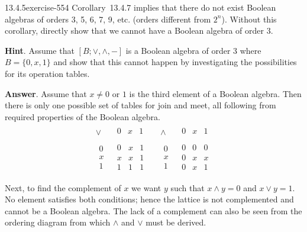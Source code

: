 \documentclass[twoside,10pt,]{book}
\numberwithin{equation}{section}
\begin{document}
\begin{divisionsolution}{13.4.5}{}{exercise-554}%
\hypertarget{p-4946}{}%
Corollary~13.4.7 implies that there do not exist Boolean algebras of orders 3, 5, 6, 7, 9, etc. (orders different from \(2^n\)). Without this corollary, directly show that we cannot have a Boolean algebra of order 3.%
\par\smallskip%
\noindent\textbf{Hint}.\quad%
\hypertarget{p-4947}{}%
Assume that \([B; \lor , \land, - ]\) is a Boolean algebra of order 3 where \(B = \{0,
x, 1\}\) and show that this cannot happen by investigating the possibilities for its operation tables.%
\par\smallskip%
\noindent\textbf{Answer}.\quad%
\hypertarget{p-4948}{}%
Assume that \(x \neq  0 \textrm{ or } 1\) is the third element of a Boolean algebra. Then there is only one possible set of tables for join and meet, all following from required properties of the Boolean algebra.%
\begin{equation*}
\begin{array}{lr}
\begin{array}{c|c}
\lor  & 
\begin{array}{ccc}
0 & x & 1 \\
\end{array}
\\
\hline
\begin{array}{c}
0 \\
x \\
1 \\
\end{array}
& 
\begin{array}{ccc}
0 & x & 1 \\
x & x & 1 \\
1 & 1 & 1 \\
\end{array}
\\
\end{array}       
& 
\begin{array}{c|c}
\land  & 
\begin{array}{ccc}
0 & x & 1 \\
\end{array}
\\
\hline
\begin{array}{c}
0 \\
x \\
1 \\
\end{array}
& 
\begin{array}{ccc}
0 & 0 & 0 \\
0 & x & x \\
0 & x & 1 \\
\end{array}
\\
\end{array}
\end{array}
\end{equation*}
Next, to find the complement of \(x\) we want \(y\) such that \(x \land  y = 0\) and \(x \lor  y = 1\). No element satisfies both conditions; hence the lattice is not complemented and cannot be a Boolean algebra. The lack of a complement can also be seen from the ordering diagram from which \(\land\) and \(\lor\) must be derived.%
\end{divisionsolution}%
\end{document}
